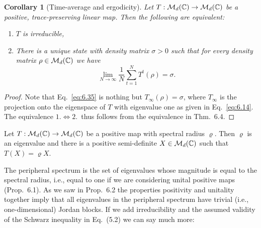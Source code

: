 \documentclass[11pt,a4paper]{article}
\theoremstyle{plain}
\newtheorem{corollary}{Corollary}[section]
\theoremstyle{definition}
\theoremstyle{remark}
\begin{document}
\begin{corollary}[Time-average and ergodicity]
    Let $T:\mathcal{M}_d(\mathbb{C})\to\mathcal{M}_d(\mathbb{C})$ be a positive, trace-preserving linear map. Then
    the following are equivalent:
    \begin{enumerate}
        \item $T$ is irreducible,
        \item There is a unique state with density matrix $\sigma>0$ such that for every
              density matrix $\rho\in\mathcal{M}_d(\mathbb{C})$ we have
              \begin{equation}\tag{6.35}\label{eq:6.35}
                  \lim_{N\to\infty}\frac{1}{N}\sum_{t=1}^N T^t(\rho) = \sigma.
              \end{equation}
    \end{enumerate}
\end{corollary}

\begin{proof}
    Note that Eq.~\eqref{eq:6.35} is nothing but $T_\infty(\rho)=\sigma$, where $T_\infty$ is
    the projection onto the eigenspace of $T$ with eigenvalue one as given in
    Eq.~\eqref{eq:6.14}. The equivalence $1.\Leftrightarrow 2$.\ thus follows from the
    equivalence in Thm.~6.4.
\end{proof}

\begin{theorem}
    Let $T:\mathcal{M}_d(\mathbb{C})\to\mathcal{M}_d(\mathbb{C})$ be a positive map with spectral radius $\varrho$.
    Then $\varrho$ is an eigenvalue and there is a positive semi-definite $X\in\mathcal{M}_d(\mathbb{C})$
    such that $T(X)=\varrho X$.
\end{theorem}

The peripheral spectrum is the set of eigenvalues whose magnitude is equal to the
spectral radius, i.e., equal to one if we are considering unital positive maps
(Prop.~6.1). As we saw in Prop.~6.2 the properties positivity and unitality together
imply that all eigenvalues in the peripheral spectrum have trivial (i.e.,
one-dimensional) Jordan blocks. If we add irreducibility and the assumed validity
of the Schwarz inequality in Eq.~(5.2) we can say much more:
\end{document}
